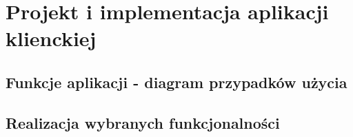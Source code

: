 \chapter{Projekt i implementacja aplikacji klienckiej}

\section{Funkcje aplikacji - diagram przypadków użycia}

\section{Realizacja wybranych funkcjonalności}